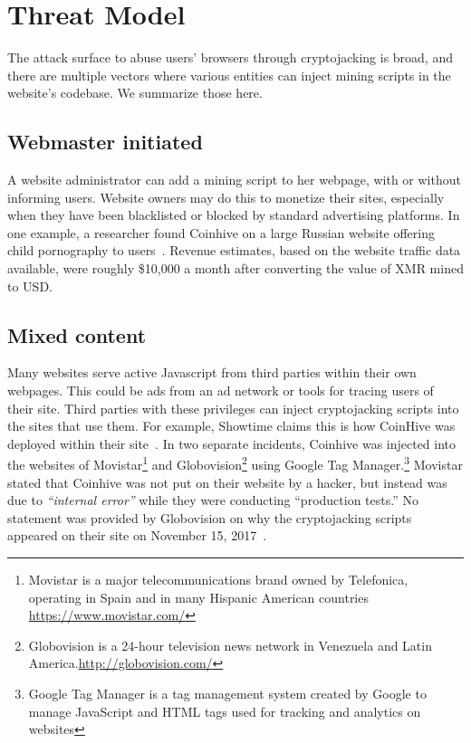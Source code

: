 
%
%
%
%
%
%

\section{Threat Model}

The attack surface to abuse users' browsers through cryptojacking is broad, and there are multiple vectors where various entities can inject mining scripts in the website's codebase. We summarize those here. 

\subsection{Webmaster initiated} 

A website administrator can add a mining script to her webpage, with or without informing users. Website owners may do this to monetize their sites, especially when they have been blacklisted or blocked by standard advertising platforms. In one example, a researcher found Coinhive on a large Russian website offering child pornography to users~\cite{coinhiveonchildporn}. Revenue estimates, based on the website traffic data available, were roughly \$10,000 a month after converting the value of XMR mined to USD.

\subsection{Mixed content} 

Many websites serve active Javascript from third parties within their own webpages. This could be ads from an ad network or tools for tracing users of their site. Third parties with these privileges can inject cryptojacking scripts into the sites that use them. For example, Showtime claims this is how CoinHive was deployed within their site~\cite{showtimehive}. In two separate incidents, Coinhive was injected into the websites of Movistar\footnote{Movistar is a major telecommunications brand owned by Telefonica, operating in Spain and in many Hispanic American countries \url{https://www.movistar.com/}} and Globovision\footnote{Globovision is a 24-hour television news network in Venezuela and Latin America.\url{http://globovision.com/}} using Google Tag Manager.\footnote{Google Tag Manager is a tag management system created by Google to manage JavaScript and HTML tags used for tracking and analytics on websites} Movistar stated that Coinhive was not put on their website by a hacker, but instead was due to \textit{``internal error''} while they were conducting ``production tests.'' No statement was provided by Globovision on why the cryptojacking scripts appeared on their site on November 15, 2017~\cite{googletagcoinhive}.

